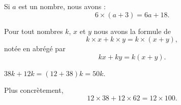 \begin{example}
    Si \( a\) est un nombre, nous avons :
    \begin{equation}
        6\times (a+3)=6a+18.
    \end{equation}
\end{example}

\begin{Aretenir}
    Pour tout nombres \( k\), \( x\) et \( y\) nous avons la formule de 
    \begin{equation}
        k\times x+k\times y=k\times (x+y),
    \end{equation}
    notée en abrégé par
    \begin{equation}
        kx+ky=k(x+y).
    \end{equation}
\end{Aretenir}

\begin{example}
    \( 38k+12k=(12+38)k=50k\).

    Plus concrètement,
    \begin{equation}
        12\times 38+12\times 62=12\times 100.
    \end{equation}
\end{example}


